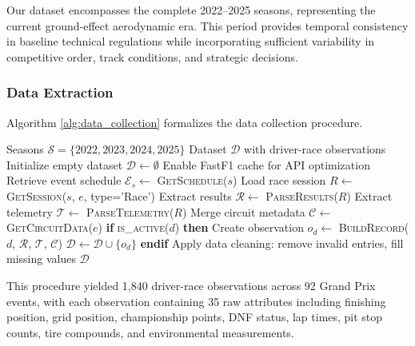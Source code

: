 \documentclass[conference]{IEEEtran}
\begin{document}
Our dataset encompasses the complete 2022--2025 seasons, representing the current ground-effect aerodynamic era. This period provides temporal consistency in baseline technical regulations while incorporating sufficient variability in competitive order, track conditions, and strategic decisions.

\subsubsection{Data Extraction}

Algorithm \ref{alg:data_collection} formalizes the data collection procedure.

\begin{algorithm}
\caption{Historical Race Data Extraction}
\label{alg:data_collection}
\begin{algorithmic}[1]
\REQUIRE Seasons $\mathcal{S} = \{2022, 2023, 2024, 2025\}$
\ENSURE Dataset $\mathcal{D}$ with driver-race observations
\STATE Initialize empty dataset $\mathcal{D} \leftarrow \emptyset$
\STATE Enable FastF1 cache for API optimization
    \STATE Retrieve event schedule $\mathcal{E}_s \leftarrow$ \textsc{GetSchedule}($s$)
        \STATE Load race session $R \leftarrow$ \textsc{GetSession}($s$, $e$, type='Race')
            \STATE Extract results $\mathcal{R} \leftarrow$ \textsc{ParseResults}($R$)
            \STATE Extract telemetry $\mathcal{T} \leftarrow$ \textsc{ParseTelemetry}($R$)
            \STATE Merge circuit metadata $\mathcal{C} \leftarrow$ \textsc{GetCircuitData}($e$)
                \STATE \textbf{if} \textsc{is\_active}($d$) \textbf{then}
                \STATE \quad Create observation $o_d \leftarrow$ \textsc{BuildRecord}($d$, $\mathcal{R}$, $\mathcal{T}$, $\mathcal{C}$)
                \STATE \quad $\mathcal{D} \leftarrow \mathcal{D} \cup \{o_d\}$
                \STATE \textbf{endif}
            \ENDFOR
        \ENDIF
    \ENDFOR
\ENDFOR
\STATE Apply data cleaning: remove invalid entries, fill missing values
\RETURN $\mathcal{D}$
\end{algorithmic}
\end{algorithm}

This procedure yielded 1,840 driver-race observations across 92 Grand Prix events, with each observation containing 35 raw attributes including finishing position, grid position, championship points, DNF status, lap times, pit stop counts, tire compounds, and environmental measurements.
\end{document}
